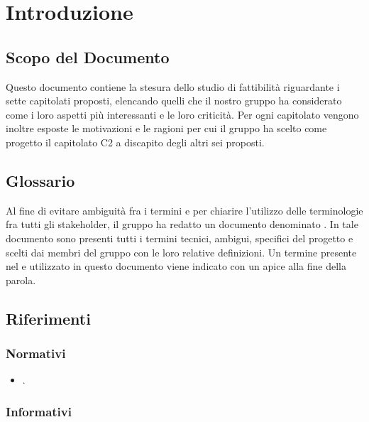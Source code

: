 \section{Introduzione}
\subsection{Scopo del Documento}
Questo documento contiene la stesura dello studio di fattibilità riguardante i sette capitolati proposti, elencando quelli che il nostro gruppo ha considerato come i loro aspetti più interessanti e le loro criticità. Per ogni capitolato vengono inoltre esposte le motivazioni e le ragioni per cui il gruppo ha scelto come progetto il capitolato C2 \NomeProgetto{} a discapito degli altri sei proposti.

\subsection{Glossario}
Al fine di evitare ambiguità fra i termini e per chiarire l'utilizzo delle terminologie fra tutti gli stakeholder, il gruppo \Gruppo{} ha redatto un documento denominato .
In tale documento sono presenti tutti i termini tecnici, ambigui, specifici del progetto e scelti dai membri del gruppo con le loro relative definizioni.
Un termine presente nel  e utilizzato in questo documento viene indicato con un apice  alla fine della parola.

\subsection{Riferimenti}

\subsubsection{Normativi}
\begin{itemize}
\item {}.
\end{itemize}

\subsubsection{Informativi}

